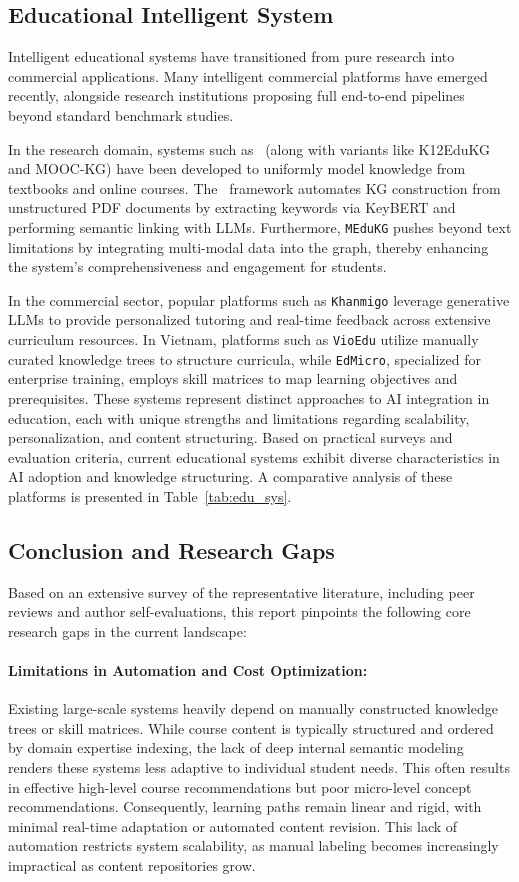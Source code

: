 \subsection{Educational Intelligent System}
Intelligent educational systems have transitioned from pure research into commercial applications. Many intelligent commercial platforms have emerged recently, alongside research institutions proposing full end-to-end pipelines beyond standard benchmark studies. 

In the research domain, systems such as~\cite{EduKG} (along with variants like K12EduKG and MOOC-KG) have been developed to uniformly model knowledge from textbooks and online courses. The~\cite{EduKGPipe} framework automates KG construction from unstructured PDF documents by extracting keywords via KeyBERT and performing semantic linking with LLMs. Furthermore, \texttt{MEduKG} pushes beyond text limitations by integrating multi-modal data into the graph, thereby enhancing the system's comprehensiveness and engagement for students.

In the commercial sector, popular platforms such as \texttt{Khanmigo} leverage generative LLMs to provide personalized tutoring and real-time feedback across extensive curriculum resources. In Vietnam, platforms such as \texttt{VioEdu} utilize manually curated knowledge trees to structure curricula, while \texttt{EdMicro}, specialized for enterprise training, employs skill matrices to map learning objectives and prerequisites. These systems represent distinct approaches to AI integration in education, each with unique strengths and limitations regarding scalability, personalization, and content structuring. Based on practical surveys and evaluation criteria, current educational systems exhibit diverse characteristics in AI adoption and knowledge structuring. A comparative analysis of these platforms is presented in Table~\ref{tab:edu_sys}.



\subsection{Conclusion and Research Gaps}\label{sub:gaps}
Based on an extensive survey of the representative literature, including peer reviews and author self-evaluations, this report pinpoints the following core research gaps in the current landscape:

\paragraph*{{Limitations in Automation and Cost Optimization:}} Existing large-scale systems heavily depend on manually constructed knowledge trees or skill matrices. While course content is typically structured and ordered by domain expertise indexing, the lack of deep internal semantic modeling renders these systems less adaptive to individual student needs. This often results in effective high-level course recommendations but poor micro-level concept recommendations. Consequently, learning paths remain linear and rigid, with minimal real-time adaptation or automated content revision. This lack of automation restricts system scalability, as manual labeling becomes increasingly impractical as content repositories grow.
